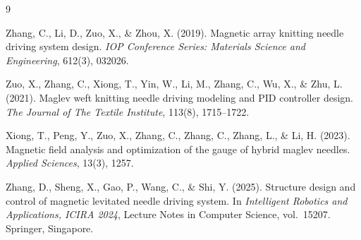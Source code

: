 \documentclass[12pt, a4paper]{article}
\begin{document}
\begingroup
\renewcommand{\section}[2]{}
\begin{thebibliography}{9}

Zhang, C., Li, D., Zuo, X., \& Zhou, X. (2019).
Magnetic array knitting needle driving system design.
\textit{IOP Conference Series: Materials Science and Engineering},
612(3), 032026.

Zuo, X., Zhang, C., Xiong, T., Yin, W., Li, M., Zhang, C., Wu, X.,
\& Zhu, L. (2021).
Maglev weft knitting needle driving modeling and PID controller design.
\textit{The Journal of The Textile Institute}, 113(8), 1715--1722.

Xiong, T., Peng, Y., Zuo, X., Zhang, C., Zhang, C., Zhang, L.,
\& Li, H. (2023).
Magnetic field analysis and optimization of the gauge of hybrid maglev
needles.
\textit{Applied Sciences}, 13(3), 1257.

Zhang, D., Sheng, X., Gao, P., Wang, C., \& Shi, Y. (2025).
Structure design and control of magnetic levitated needle driving system.
In \textit{Intelligent Robotics and Applications, ICIRA 2024},
Lecture Notes in Computer Science, vol.\ 15207. Springer, Singapore.

\end{thebibliography}
\endgroup
\end{document}
